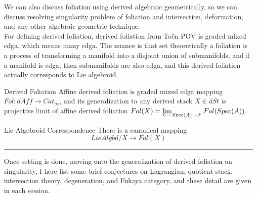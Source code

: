 \documentclass{article}
\begin{document}
\noindent
We can also discuss foliation using derived algebraic geometrically, so we can discuss resolving singularity problem of foliation
and intersection, deformation, and any other algebraic geometric technique. \\

\noindent
For defining derived foliation, derived foliation from To\"en POV is graded mixed cdga, which means many cdga.
The nuance is that set theoretically a foliation is a process of transforming a manifold into a disjoint union of submanifolds,
and if a manifold is cdga, then submanifolds are also cdga,
and this derived foliation actually corresponds to Lie algebroid. \\


\begin{definition}{Derived Foliation}{}
Affine derived foliation is graded mixed cdga mapping $Fol: dAff \to Cat_\infty$,
and its generalization to any derived stack $X\in dSt$ is projective limit of affine derived foliation 
$Fol(X) = \varprojlim_{Spec(A) \to \mathcal{F}} Fol(Spec(A))$. 
\end{definition}


\begin{proposition} {Lie Algebroid Correspondence}{}
There is a canonical mapping
\[ LieAlgbd/X \to Fol(X) \]
\end{proposition}





\vspace{0.5cm}
\noindent\rule{\textwidth}{0.4pt}
\vspace{0.5cm}

\noindent
Once setting is done, moving onto the generalization of derived foliation on singularity, 
I here list some brief conjectures on Lagrangian, quotient stack, intersection theory, degeneration, and Fukaya category,
and these detail are given in each session. \\
\end{document}
